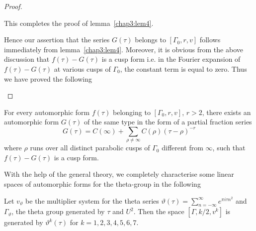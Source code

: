 \begin{proof}
\begin{enumerate}
This completes the proof of lemma~\ref{chap3:lem4}.

Hence our assertion that the series $G(\tau)$ belongs to $[\Gamma_0,
  r,v]$ follows immediately from lemma~\ref{chap3:lem4}. Moreover, it is obvious from
the above discussion that $f(\tau)-G(\tau)$ is a cusp form i.e. in the
Fourier expansion of $f(\tau)-G(\tau)$ at various cusps of $\Gamma_0$,
the constant term is equal to zero. Thus we have proved the following
\end{enumerate}
\end{proof}

\begin{thm}\label{chap3:thm17}
For every automorphic form $f(\tau)$ belonging to $[\Gamma_0, r,v]$,
$r>2$, there \pageoriginale exists an automorphic form $G(\tau)$ of
the same type in the form of a partial fraction series
$$
G(\tau) = C(\infty) + \sum_{\rho\neq \infty} C(\rho)(\tau-\rho)^{-r}
$$
where $\rho$ runs over all distinct parabolic cusps of $\Gamma_0$
different from $\infty$, such that $f(\tau)-G(\tau)$ is a cusp form.
\end{thm}

With the help of the general theory, we completely characterise some
linear spaces of automorphic forms for the theta-group in the
following 

\begin{thm}\label{chap3:thm18}
Let $v_{\vartheta}$ be the multiplier system for the theta series
$\vartheta(\tau) = \sum^{\infty}_{n=-\infty}e^{\pi i \tau n^2}$ and
$\Gamma_{\vartheta}$, the theta group generated by $\tau$ and
$U^2$. Then the space $[\Gamma, k/2, v^k]$ is generated by
$\vartheta^k(\tau)$ for $k=1,2,3,4,5,6,7$.
\end{thm}

